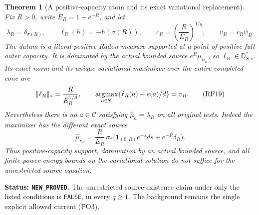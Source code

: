 \documentclass[11pt,a4paper]{article}
\numberwithin{equation}{section}
\newtheorem{theorem}{Theorem}[section]
\theoremstyle{definition}
\theoremstyle{remark}
\begin{document}
\begin{theorem}[A positive-capacity atom and its exact variational replacement]
\label{thm:r12-positive-capacity-atom-source-obstruction}
Fix $R>0$, write $E_R=1-e^{-R}$, and let
\[
 \lambda_R=\delta_{\sigma(R)},\qquad
 \ell_R(h)=-h(\sigma(R)),\qquad
 c_R=\left(\frac R{E_R}\right)^{1/q},\qquad
 v_R=c_R\psi_R.
 \tag{RF18}
\]
The datum is a literal positive Radon measure supported
at a point of positive full outer capacity.  It is
dominated by the actual bounded source
$e^R\mu_{\psi_R}$, so $\ell_R\in\mathbb D_{S,\mathrm s}^*$.
Its exact norm and its unique variational maximizer
over the entire completed cone are
\[
       \|\ell_R\|_* =\frac R{E_R^{1/d}},\qquad
       \mathop{\rm argmax}_{a\in\mathscr C}
                  \{\ell_R(a)-e(a)/d\}=v_R.
 \tag{RF19}
\]
Nevertheless there is no $a\in\mathscr C$ satisfying
$\widehat\mu_a=\lambda_R$ on all original tests.
Indeed the maximizer has the different exact source
\[
 \widehat\mu_{v_R}
     =\frac R{E_R}\,
           \sigma_*\bigl(\mathbf1_{(0,R)}e^{-s}ds+e^{-R}\delta_R\bigr).
 \tag{RF20}
\]
Thus positive-capacity support, domination by an actual
bounded source, and all finite power-energy bounds on
the variational solution do not suffice for the
unrestricted source equation.
\end{theorem}

\noindent\textbf{Status: \texttt{NEW\_PROVED}}.  The
unrestricted source-existence claim under only the
listed conditions is \texttt{FALSE}, in every $q\ge1$.
The background remains the single explicit allowed
current \textup{(PO3)}.
\end{document}
